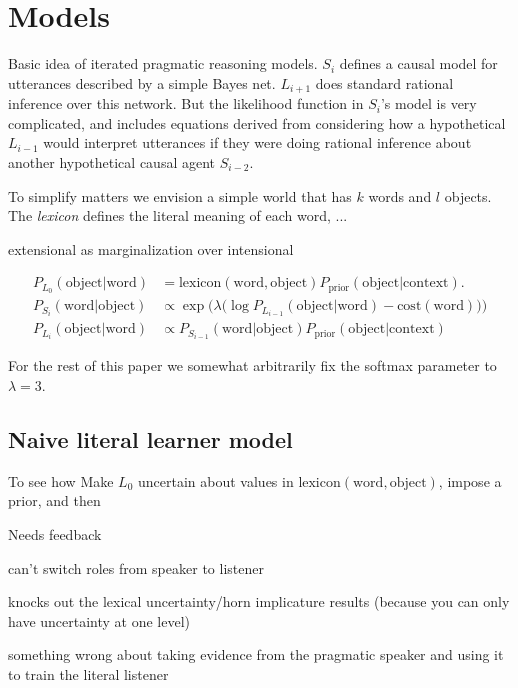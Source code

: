 \documentclass{article} %
\begin{document}
\section{Models}

Basic idea of iterated pragmatic reasoning models. $S_i$ defines a causal model for utterances described by a simple Bayes net. $L_{i+1}$ does standard rational inference over this network. But the likelihood function in $S_i$'s model is very complicated, and includes equations derived from considering how a hypothetical $L_{i-1}$ would interpret utterances if they were doing rational inference about another hypothetical causal agent $S_{i-2}$.

To simplify matters we envision a simple world that has $k$ words and $l$ objects. The \textit{lexicon} defines the literal meaning of each word, ...

extensional as marginalization over intensional

\newcommand{\word}{\text{word}}
\newcommand{\obj}{\text{object}}
\begin{align*}
P_{L_0}(\obj | \word) &= \text{lexicon}(\word, \obj) P_{\text{prior}}(\obj | \text{context}). \\
P_{S_i}(\word | \obj) &\propto \exp\Big(\lambda \big(\log P_{L_{i - 1}}(\obj | \word) - \text{cost}(\word)\big)\Big) \\
P_{L_i}(\obj | \word) &\propto P_{S_{i-1}}(\word | \obj) P_{\text{prior}}(\obj | \text{context})
\end{align*}

For the rest of this paper we somewhat arbitrarily fix the softmax parameter to $\lambda = 3$.

\subsection{Naive literal learner model}



To see how
Make $L_0$ uncertain about values in $\text{lexicon}(\word, \obj)$, impose a prior, and then

Needs feedback

can't switch roles from speaker to listener

knocks out the lexical uncertainty/horn implicature results (because you can only have uncertainty at one level)

something wrong about taking evidence from the pragmatic speaker and using it to train the literal listener
\end{document}
